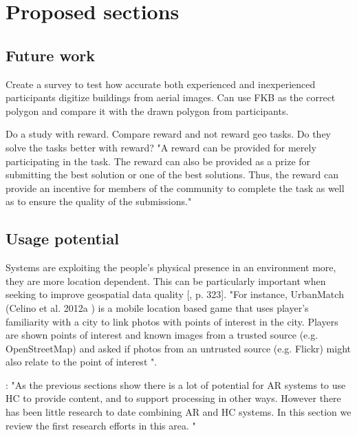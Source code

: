 \chapter{Proposed sections}

\section{Future work}

Create a survey to test how accurate both experienced and inexperienced participants digitize buildings from aerial images. Can use FKB as the correct polygon and compare it with the drawn polygon from participants. 

Do a study with reward. Compare reward and not reward geo tasks. Do they solve the tasks better with reward? "A reward can be provided for merely participating in the task. The reward can also be provided as a prize for submitting the best solution or one of the best solutions. Thus, the reward can provide an incentive for members of the community to complete the task as well as to ensure the quality of the submissions."  %

\section{Usage potential}
Systems are exploiting the people's physical presence in an environment more, they are more location dependent. This can be particularly important when seeking to improve geospatial data quality [\citep{Meier2013}, p. 323]. "For instance, UrbanMatch (Celino et al. 2012a ) is a mobile location based game that uses player’s familiarity with a city to link photos with points of interest in the city. Players are shown points of interest and known images from a trusted source (e.g. OpenStreetMap) and asked if photos from an untrusted source (e.g. Flickr) might also relate to the point of interest ".  

\citep{Meier2013}:  "As the previous sections show there is a lot of potential for AR systems to use HC to provide content, and to support processing in other ways. However there has been
little research to date combining AR and HC systems. In this section we review the first research efforts in this area. " 